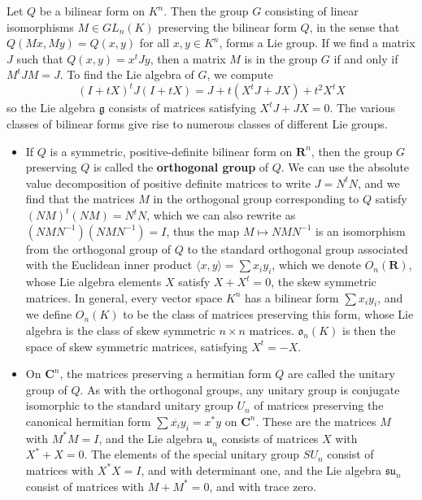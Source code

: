 \begin{example}
    Let $Q$ be a bilinear form on $K^n$. Then the group $G$ consisting of linear isomorphisms $M \in GL_n(K)$ preserving the bilinear form $Q$, in the sense that $Q(Mx,My) = Q(x,y)$ for all $x,y \in K^n$, forms a Lie group. If we find a matrix $J$ such that $Q(x,y) = x^tJy$, then a matrix $M$ is in the group $G$ if and only if $M^tJM = J$. To find the Lie algebra of $G$, we compute
    \[ (I + tX)^tJ(I + tX) = J + t(X^tJ + JX) + t^2 X^tX \]
    so the Lie algebra $\mathfrak{g}$ consists of matrices satisfying $X^tJ + JX = 0$. The various classes of bilinear forms give rise to numerous classes of different Lie groups.
    \begin{itemize}
        \item If $Q$ is a symmetric, positive-definite bilinear form on $\mathbf{R}^n$, then the group $G$ preserving $Q$ is called the {\bf orthogonal group} of $Q$. We can use the absolute value decomposition of positive definite matrices to write $J = N^tN$, and we find that the matrices $M$ in the orthogonal group corresponding to $Q$ satisfy $(NM)^t(NM) = N^tN$, which we can also rewrite as $(NMN^{-1})(NMN^{-1}) = I$, thus the map $M \mapsto NMN^{-1}$ is an isomorphism from the orthogonal group of $Q$ to the standard orthogonal group associated with the Euclidean inner product $\langle x, y \rangle = \sum x_i y_i$, which we denote $O_n(\mathbf{R})$, whose Lie algebra elements $X$ satisfy $X + X^t = 0$, the skew symmetric matrices. In general, every vector space $K^n$ has a bilinear form $\sum x_i y_i$, and we define $O_n(K)$ to be the class of matrices preserving this form, whose Lie algebra is the class of skew symmetric $n \times n$ matrices. $\mathfrak{o}_n(K)$ is then the space of skew symmetric matrices, satisfying $X^t = -X$.

        \item On $\mathbf{C}^n$, the matrices preserving a hermitian form $Q$ are called the unitary group of $Q$. As with the orthogonal groups, any unitary group is conjugate isomorphic to the standard unitary group $U_n$ of matrices preserving the canonical hermitian form $\sum \overline{x_i} y_i = x^*y$ on $\mathbf{C}^n$. These are the matrices $M$ with $M^*M = I$, and the Lie algebra $\mathfrak{u}_n$ consists of matrices $X$ with $X^* + X = 0$. The elements of the special unitary group $SU_n$ consist of matrices with $X^*X = I$, and with determinant one, and the Lie algebra $\mathfrak{su}_n$ consist of matrices with $M + M^* = 0$, and with trace zero.


\end{itemize}
\end{example}
